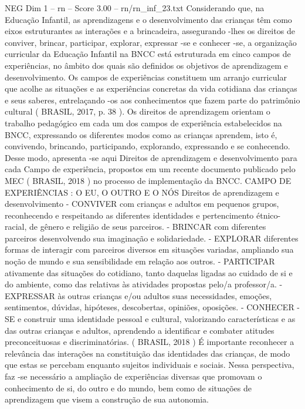 \begin{textsample}{NEG Dim 1 – rn – Score 3.00 – rn/rn\_inf\_23.txt}  \label{ex:f1_neg_025}
Considerando que, na Educação Infantil, as aprendizagens e o desenvolvimento das crianças têm como eixos estruturantes as interações e a brincadeira, assegurando -lhes os direitos de conviver, brincar, participar, explorar, expressar -se e conhecer -se, a organização curricular da Educação Infantil na BNCC está estruturada em cinco campos de experiências, no âmbito dos quais são definidos os objetivos de aprendizagem e desenvolvimento.
Os campos de experiências constituem um arranjo curricular que acolhe as situações e as experiências concretas da vida cotidiana das crianças e seus saberes, entrelaçando -os aos conhecimentos que fazem parte do patrimônio cultural ( BRASIL, 2017, p. 38 ).
Os direitos de aprendizagem orientam o trabalho pedagógico em cada um dos campos de experiência estabelecidos na BNCC, expressando os diferentes modos como as crianças aprendem, isto é, convivendo, brincando, participando, explorando, expressando e se conhecendo.
Desse modo, apresenta -se aqui Direitos de aprendizagem e desenvolvimento para cada Campo de experiência, propostos em um recente documento publicado pelo MEC ( BRASIL, 2018 ) no processo de implementação da BNCC.
CAMPO DE EXPERIÊNCIAS : O EU, O OUTRO E O NÓS Direitos de aprendizagem e desenvolvimento - CONVIVER com crianças e adultos em pequenos grupos, reconhecendo e respeitando as diferentes identidades e pertencimento étnico-racial, de gênero e religião de seus parceiros. - BRINCAR com diferentes parceiros desenvolvendo sua imaginação e solidariedade. - EXPLORAR diferentes formas de interagir com parceiros diversos em situações variadas, ampliando sua noção de mundo e sua sensibilidade em relação aos outros. - PARTICIPAR ativamente das situações do cotidiano, tanto daquelas ligadas ao cuidado de si e do ambiente, como das relativas às atividades propostas pelo/a professor/a. - EXPRESSAR às outras crianças e/ou adultos suas necessidades, emoções, sentimentos, dúvidas, hipóteses, descobertas, opiniões, oposições. - CONHECER -SE e construir uma identidade pessoal e cultural, valorizando características e as das outras crianças e adultos, aprendendo a identificar e combater atitudes preconceituosas e discriminatórias. ( BRASIL, 2018 ) É importante reconhecer a relevância das interações na constituição das identidades das crianças, de modo que estas se percebam enquanto sujeitos individuais e sociais.
Nessa perspectiva, faz -se necessário a ampliação de experiências diversas que promovam o conhecimento de si, do outro e do mundo, bem como de situações de aprendizagem que visem a construção de sua autonomia.

\end{textsample}
